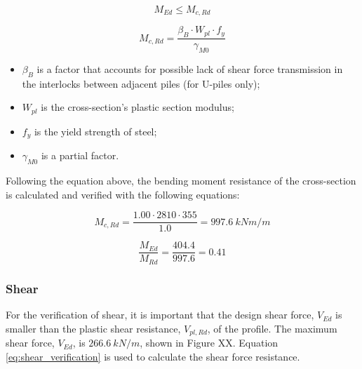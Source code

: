 \begin{equation}
    M_{Ed} \leq M_{c,Rd}
\end{equation}

\begin{equation}
    M_{c,Rd} = \frac{\beta_{B} \cdot W_{pl} \cdot f_{y}}{\gamma_{M0}}
    \label{eq:bending_plastic}
\end{equation}

\begin{itemize}
  \item $\beta_B$ is a factor that accounts for possible lack of shear force transmission in the interlocks between adjacent piles (for U-piles only);
  \item $W_{pl}$ is the cross-section’s plastic section modulus;
  \item $f_y$ is the yield strength of steel;
  \item $\gamma_{M0}$ is a partial factor.
\end{itemize}

Following the equation above, the bending moment resistance of the cross-section is calculated and verified with the following equations:

\begin{equation}
    M_{c,Rd} = \frac{1.00 \cdot 2810 \cdot 355}{1.0} = 997.6 \ kNm/m
\end{equation}

\begin{equation}
    \frac{M_{Ed}}{M_{Rd}} = \frac{404.4}{997.6} = 0.41
\end{equation}



\subsubsection{Shear}

For the verification of shear, it is important that the design shear force, $V_{Ed}$ is smaller than the plastic shear resistance, $V_{pl,Rd}$, of the profile. The maximum shear force, $V_{Ed}$, is $266.6 \ kN/m$, shown in Figure XX. Equation \ref{eq:shear_verification} is used to calculate the shear force resistance.

